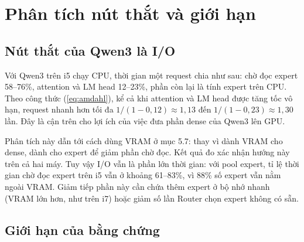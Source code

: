 \section{Phân tích nút thắt và giới hạn}

\subsection{Nút thắt của Qwen3 là I/O}

Với Qwen3 trên i5 chạy CPU, thời gian một request chia như sau: chờ đọc expert 58--76\%, attention và LM head 12--23\%, phần còn lại là tính expert trên CPU. Theo công thức (\ref{eq:amdahl}), kể cả khi attention và LM head được tăng tốc vô hạn, request nhanh hơn tối đa $1/(1-0{,}12)\approx1{,}13$ đến $1/(1-0{,}23)\approx1{,}30$ lần. Đây là cận trên cho lợi ích của việc đưa phần dense của Qwen3 lên GPU.

Phân tích này dẫn tới cách dùng VRAM ở mục 5.7: thay vì dành VRAM cho dense, dành cho expert để giảm phần chờ đọc. Kết quả đo xác nhận hướng này trên cả hai máy. Tuy vậy I/O vẫn là phần lớn thời gian: với pool expert, tỉ lệ thời gian chờ đọc expert trên i5 vẫn ở khoảng 61--83\%, vì 88\% số expert vẫn nằm ngoài VRAM. Giảm tiếp phần này cần chứa thêm expert ở bộ nhớ nhanh (VRAM lớn hơn, như trên i7) hoặc giảm số lần Router chọn expert không có sẵn.

\subsection{Giới hạn của bằng chứng}


